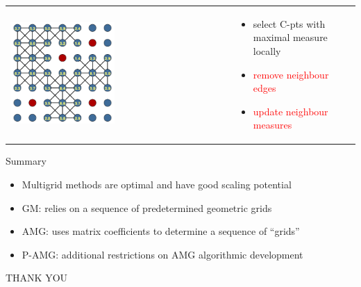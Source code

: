 \documentclass[12pt]{beamer}
\newcommand{\re}[1]{{\textcolor{red}       {#1}}}
\begin{document}
\begin{frame}


\begin{tabular}{ p{} p{}}

\hspace{5mm} \includegraphics[width=0.48\textwidth]{PAMG3.png} &

\vspace{-1.75in}

\begin{itemize}
  \item {select C-pts with maximal measure locally}
  \item \re{remove neighbour edges}
  \item \re{update neighbour measures}

\end{itemize}
\end{tabular}
\end{frame}

\begin{frame}{Summary}
\begin{itemize}
  \item Multigrid methods are optimal and have good scaling potential
  \vspace{1mm}
  \item GM: relies on a sequence of predetermined geometric grids
  \item AMG: uses matrix coefficients to determine a sequence of ``grids''
  \vspace{1mm}
  \item P-AMG: additional restrictions on AMG algorithmic development
\end{itemize}
\pause
\begin{center}
  \large{THANK YOU}
\end{center}
\end{frame}
\end{document}
